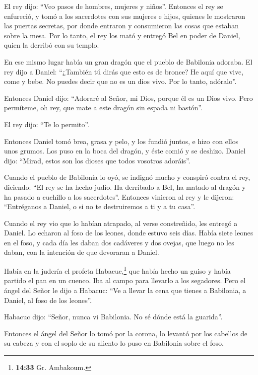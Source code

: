  El rey dijo: ``Veo pasos de hombres, mujeres y niños''.
Entonces el rey se enfureció,  y tomó a los sacerdotes
con sus mujeres e hijos, quienes le mostraron las puertas secretas, por
donde entraron y consumieron las cosas que estaban sobre la mesa.
 Por lo tanto, el rey los mató y entregó Bel en poder de
Daniel, quien la derribó con su templo.

 En ese mismo lugar había un gran dragón que el pueblo de
Babilonia adoraba.  El rey dijo a Daniel: ``¿También tú
dirás que esto es de bronce? He aquí que vive, come y bebe. No puedes
decir que no es un dios vivo. Por lo tanto, adóralo''.

 Entonces Daniel dijo: ``Adoraré al Señor, mi Dios,
porque él es un Dios vivo.  Pero permíteme, oh rey, que
mate a este dragón sin espada ni bastón''.

El rey dijo: ``Te lo permito''.

 Entonces Daniel tomó brea, grasa y pelo, y los fundió
juntos, e hizo con ellos unos grumos. Los puso en la boca del dragón, y
éste comió y se deshizo. Daniel dijo: ``Mirad, estos son los dioses que
todos vosotros adoráis''.

 Cuando el pueblo de Babilonia lo oyó, se indignó mucho y
conspiró contra el rey, diciendo: ``El rey se ha hecho judío. Ha
derribado a Bel, ha matado al dragón y ha pasado a cuchillo a los
sacerdotes''.  Entonces vinieron al rey y le dijeron:
``Entréganos a Daniel, o si no te destruiremos a ti y a tu casa''.

 Cuando el rey vio que lo habían atrapado, al verse
constreñido, les entregó a Daniel.  Lo echaron al foso de
los leones, donde estuvo seis días.  Había siete leones
en el foso, y cada día les daban dos cadáveres y dos ovejas, que luego
no les daban, con la intención de que devoraran a Daniel.

 Había en la judería el profeta Habacuc,\footnote{\textbf{14:33}
  Gr. Ambakoum.} que había hecho un guiso y había partido el pan en un
cuenco. Iba al campo para llevarlo a los segadores.  Pero
el ángel del Señor le dijo a Habacuc: ``Ve a llevar la cena que tienes a
Babilonia, a Daniel, al foso de los leones''.

 Habacuc dijo: ``Señor, nunca vi Babilonia. No sé dónde
está la guarida''.

 Entonces el ángel del Señor lo tomó por la corona, lo
levantó por los cabellos de su cabeza y con el soplo de su aliento lo
puso en Babilonia sobre el foso.

